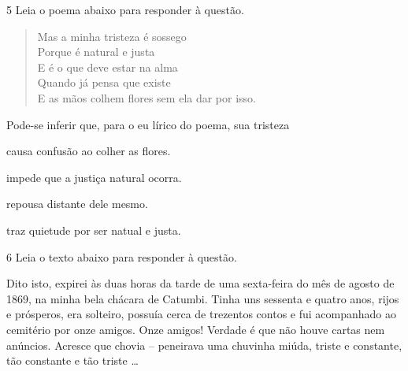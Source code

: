 \num{5} Leia o poema abaixo para responder à questão. 

\begin{myquote}
\begin{verse}

Mas a minha tristeza é sossego \\
Porque é natural e justa \\
E é o que deve estar na alma \\
Quando já pensa que existe \\
E as mãos colhem flores sem ela dar por isso.

\end{verse}


\end{myquote}

Pode-se inferir que, para o eu lírico do poema, sua tristeza

\begin{escolha}

    \item causa confusão ao colher as flores.

    \item impede que a justiça natural ocorra.

    \item repousa distante dele mesmo. 

    \item traz quietude por ser natual e justa. 

\end{escolha}

\num{6} Leia o texto abaixo para responder à questão. 


\begin{myquote}

Dito isto, expirei às duas horas da tarde de uma
sexta-feira do mês de agosto de 1869, na minha bela
chácara de Catumbi. Tinha uns sessenta e quatro anos,
rijos e prósperos, era solteiro, possuía cerca de trezentos
contos e fui acompanhado ao cemitério por onze amigos.
Onze amigos! Verdade é que não houve cartas nem
anúncios. Acresce que chovia -- peneirava uma chuvinha
miúda, triste e constante, tão constante e tão triste \ldots{}


\end{myquote}

